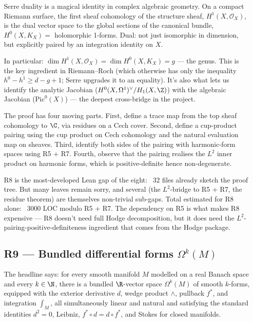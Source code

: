 \begin{layman}
Serre duality is a magical identity in complex algebraic geometry.
On a compact Riemann surface, the first sheaf cohomology of the
structure sheaf, \(H^1(X, \mathcal{O}_X)\), is the dual vector
space to the global sections of the canonical bundle,
\(H^0(X, K_X) = \) holomorphic 1-forms.  Dual: not just isomorphic
in dimension, but explicitly paired by an integration identity on
\(X\).

In particular: \(\dim H^1(X, \mathcal{O}_X) = \dim H^0(X, K_X) = g\)
--- the genus.  This is the key ingredient in Riemann--Roch (which
otherwise has only the inequality \(h^0 - h^1 \geq d - g + 1\); Serre
upgrades it to an equality).  It's also what lets us identify the
analytic Jacobian (\(H^0(X, \Omega^1)^\vee / H_1(X, \Z)\)) with the
algebraic Jacobian (\(\mathrm{Pic}^0(X)\)) --- the deepest cross-bridge
in the project.

The proof has four moving parts.  First, define a trace map from the
top sheaf cohomology to \(\C\), via residues on a Cech cover.
Second, define a cup-product pairing using the cup product on Cech
cohomology and the natural evaluation map on sheaves.  Third,
identify both sides of the pairing with harmonic-form spaces using
R5 + R7.  Fourth, observe that the pairing realises the
\(L^2\) inner product on harmonic forms, which is positive-definite
hence non-degenerate.

R8 is the most-developed Lean gap of the eight: ~32 files already
sketch the proof tree.  But many leaves remain sorry, and several
(the \(L^2\)-bridge to R5 + R7, the residue theorem) are themselves
non-trivial sub-gaps.  Total estimated for R8 alone: ~3000 LOC
modulo R5 + R7.  The dependency on R5 is what makes R8 expensive ---
R8 doesn't need full Hodge decomposition, but it does need the
\(L^2\)-pairing-positive-definiteness ingredient that comes from the
Hodge package.
\end{layman}

\subsection{R9 --- Bundled differential forms \(\Omega^{k}(M)\)}
\label{subsec:gap-R9-bundled-forms}

The headline says: for every smooth manifold \(M\) modelled on a real
Banach space and every \(k \in \N\), there is a bundled \(\R\)-vector
space \(\Omega^{k}(M)\) of smooth \(k\)-forms, equipped with the
exterior derivative \(d\), wedge product \(\wedge\), pullback \(f^*\),
and integration \(\int_M\), all simultaneously linear and natural and
satisfying the standard identities \(d^{2}=0\), Leibniz, \(f^{*} \circ
d = d \circ f^{*}\), and Stokes for closed manifolds.

